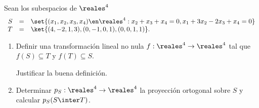 \begin{enunciado}{\ejExtra}
  Sean los subespacios de $\reales^4$
  $$
    \begin{array}{rcl}
      S & = & \set{(x_1, x_2, x_3, x_4) \en \reales^4 : x_2 + x_3 + x_4 = 0, x_1 + 3x_2 - 2x_3 + x_4 = 0} \\
      T & = & \ket{(4, -2, 1, 3), (0, -1, 0, 1), (0,0,1,1)}.
    \end{array}
  $$
  \begin{enumerate}[label=\alph*)]
    \item Definir una transformación lineal no nula $f: \reales^4 \to \reales^4$ tal que $f(S) \subseteq T$ y
          $f(T) \subseteq S$.

          Justificar la buena definición.

    \item Determinar $p_S : \reales^4 \to \reales^4$ la proyección ortogonal sobre $S$ y calcular $p_S(S \inter T)$.
  \end{enumerate}
\end{enunciado}

